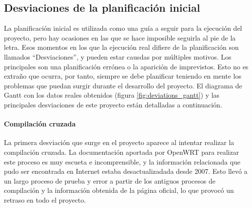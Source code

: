\documentclass[12pt]{article}
\begin{document}
            \begin{table}[!htbp]             
                \centering                  
                \caption{Descripción de la fase de documentación}
                \label{tab:fase_doc}
            \end{table}

    \subsection{Desviaciones de la planificación inicial}
        La planificación inicial es utilizada como una guía a seguir para la ejecución del proyecto, pero hay ocasiones en las que se hace imposible seguirla al pie de la letra. Esos momentos en los que la ejecución real difiere de la planificación son llamados ``Desviaciones'', y pueden estar causdas por múltiples motivos. Los principales son una planificación errónea o la aparición de imprevistos. Esto no es extraño que ocurra, por tanto, siempre se debe planificar teniendo en mente los problemas que puedan surgir durante el desarrollo del proyecto. El diagrama de Gantt con los datos reales obtenidos (figura \ref{fig:deviations_gantt}) y las principales desviaciones de este proyecto están detalladas a continuación.

        \paragraph{ Compilación cruzada}
        La primera desviación que surge en el proyecto aparece al intentar realizar la compilación cruzada. La documentación aportada por OpenWRT para realizar este proceso es muy escueta e incomprensible, y la información relacionada que pudo ser encontrada en Internet estaba desactualizadada desde 2007. Esto llevó a un largo proceso de prueba y error a partir de los antiguos procesos de compilación y la información obtenida de la página oficial, lo que provocó un retraso en todo el proyecto.
\end{document}
